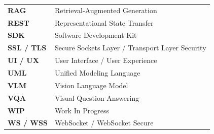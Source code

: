 \documentclass[a4paper,12pt,twoside]{report}
\begin{document}
\begin{center}
\begin{tabularx}{\textwidth}{@{} p{3.5cm} X @{}}
  \textbf{RAG}          & Retrieval-Augmented Generation \\
  \textbf{REST}         & Representational State Transfer \\
  \rowcolor[HTML]{EFEFEF}
  \textbf{SDK}          & Software Development Kit \\
  \textbf{SSL / TLS}    & Secure Sockets Layer / Transport Layer Security \\
  \rowcolor[HTML]{EFEFEF}
  \textbf{UI / UX}      & User Interface / User Experience \\
  \rowcolor[HTML]{EFEFEF}
  \textbf{UML}          & Unified Modeling Language \\
  \textbf{VLM}          & Vision Language Model \\
  \rowcolor[HTML]{EFEFEF}
  \textbf{VQA}          & Visual Question Answering \\
  \textbf{WIP}          & Work In Progress \\
  \rowcolor[HTML]{EFEFEF}
  \textbf{WS / WSS}     & WebSocket / WebSocket Secure \\
\end{tabularx}
\end{center}

\clearpage
\pagestyle{mainStyle}
\setcounter{page}{1}









\clearpage


\end{document}
